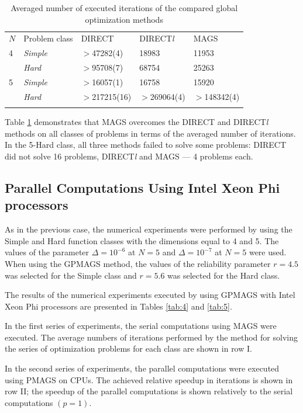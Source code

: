 \documentclass{naco}
\theoremstyle{definition}
\begin{document}
\begin{table}
  \caption{Averaged number of executed iterations of the compared global optimization methods}
  \label{tab:3}
  \center
  \begin{tabular}{lllll}
    \hline\noalign{\smallskip}
     $N$ & Problem class & DIRECT & DIRECT\textit{l} & MAGS \\
    \noalign{\smallskip} \hline \noalign{\smallskip}
      4 &	\textit{Simple}	& $>$47282(4) &	18983 &	11953 \\
        & \textit{Hard} &	$>$95708(7) &	68754 &	25263 \\
      5	& \textit{Simple} &	$>$16057(1) &	16758 &	15920 \\
        & \textit{Hard} &	$>$217215(16) &	$>$269064(4) & $>$148342(4) \\
    \noalign{\smallskip}\hline
  \end{tabular}
\end{table}

Table \ref{tab:3} demonstrates that MAGS overcomes the DIRECT and DIRECT\textit{l} methods
on all classes of problems in terms of the averaged number of iterations.
In the 5-Hard class, all three methods failed to solve some problems: DIRECT did not
solve 16 problems, DIRECT\textit{l} and MAGS --- 4 problems each.

\subsection{Parallel Computations Using Intel Xeon Phi processors}
As in the previous case, the numerical experiments were performed by using the Simple
and Hard function classes with the dimensions equal to 4 and 5. The values of the
parameter \(\Delta=10^{-6}\) at \(N=5\) and \(\Delta=10^{-7}\) at \(N=5\) were used.
When using the GPMAGS method, the values of the reliability parameter \(r=4.5\) was
selected for the Simple class and \(r=5.6\) was selected for the Hard class.

The results of the numerical experiments executed by using GPMAGS with Intel Xeon Phi processors are presented in Tables \ref{tab:4} and \ref{tab:5}.

In the first series of experiments, the serial computations using MAGS were executed.
The average numbers of iterations performed by the method for solving the series of optimization problems
for each class are shown in row I.

In the second series of experiments, the parallel computations were executed using PMAGS on CPUs.
The achieved relative speedup in iterations is shown in row II; the speedup of the
parallel computations is shown relatively to the serial computations \((p=1)\).
\end{document}
